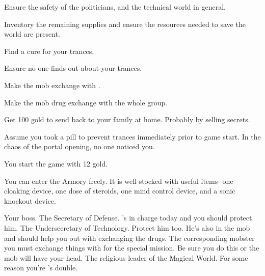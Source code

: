 \documentclass[char]{guildcamp3}
\begin{document}

\begin{itemz}[Goals]
  \item Ensure the safety of the politicians, and the technical world in general.
  \item Inventory the remaining supplies and ensure the resources needed to save the world are present.
  \item Find a cure for your trances.
  \item Ensure no one finds out about your trances.
  \item Make the mob exchange with \cServant{\informal}.
  \item Make the mob drug exchange with the whole group.
  \item Get 100 gold to send back to your family at home. Probably by selling secrets.
\end{itemz}

\begin{itemz}[Notes]
  \item Assume you took a pill to prevent trances immediately prior to game start. In the chaos of the portal opening, no one noticed you. 
  \item You start the game with 12 gold. 
  \item You can enter the Armory freely. It is well-stocked with useful items- one cloaking device, one dose of steroids, one mind control device, and a sonic knockout device.

\end{itemz}


\begin{contacts}
  \contact{\cSpecOpOne{}} Your boss.
  \contact{\cPoliOne{}} The Secretary of Defense. 's in charge today and you should protect him.
  \contact{\cPoliTwo{}} The Undersecretary of Technology. Protect him too. He's also in the mob and should help you out with exchanging the drugs. 
  \contact{\cServant{}} The corresponding mobster you must exchange things with for the special mission. Be sure you do this or the mob will have your head.
  \contact{\cPaladin{}} The religious leader of the Magical World. For some reason you're \cPaladin{}'s double. 
\end{contacts}
\end{document}
